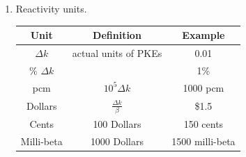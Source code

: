 \documentclass{school-22.211-notes}
\begin{document}
\begin{enumerate}
\item Reactivity units. 
\begin{table}[ht]
  \centering
  \begin{tabular}{|c|c|c|} \hline
    Unit & Definition & Example \\ \hline
    $\Delta k$ & actual units of PKEs & 0.01 \\
    \% $\Delta k$ & & 1\% \\
    pcm & $10^5 \Delta k $ & 1000 pcm \\ \hline
    Dollars & $\frac{\Delta k}{\beta}$ & \$1.5 \\
    Cents & 100 Dollars & 150 cents \\ 
    Milli-beta & 1000 Dollars & 1500 milli-beta \\ \hline
  \end{tabular}
\end{table}
\end{enumerate}
\end{document}
